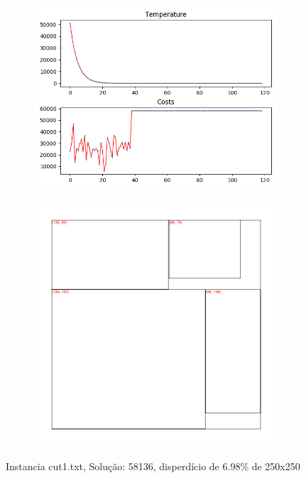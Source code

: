 \begin{figure}
\centering
\begin{subfigure}{.5\textwidth}
  \centering
  \includegraphics[width=1\linewidth]{results/cut1/3/plot}
  \label{fig:sub1}
\end{subfigure}%
\begin{subfigure}{.5\textwidth}
  \centering
  \includegraphics[width=1\linewidth]{results/cut1/3/cut}
  \label{fig:sub2}
\end{subfigure}
\caption{Instancia cut1.txt, Solução: 58136, disperdício de 6.98\% de 250x250}
\label{fig:test}
\end{figure}


